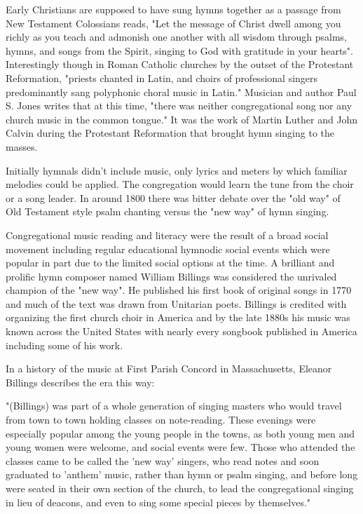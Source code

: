 \documentclass[12pt]{article}
\begin{document}
Early Christians are supposed to have sung hymns together as a passage from New Testament Colossians reads, "Let the message of Christ dwell among you richly as you teach and admonish one another with all wisdom through psalms, hymns, and songs from the Spirit, singing to God with gratitude in your hearts". Interestingly though in Roman Catholic churches by the outset of the Protestant Reformation, "priests chanted in Latin, and choirs of professional singers predominantly sang polyphonic choral music in Latin." Musician and author Paul S. Jones writes that at this time, "there was neither congregational song nor any church music in the common tongue." It was the work of Martin Luther and John Calvin during the Protestant Reformation that brought hymn singing to the masses.

Initially hymnals didn't include music, only lyrics and meters by which familiar melodies could be applied. The congregation would learn the tune from the choir or a song leader. In around 1800 there was bitter debate over the "old way" of Old Testament style psalm chanting versus the "new way" of hymn singing.

Congregational music reading and literacy were the result of a broad social movement including regular educational hymnodic social events which were popular in part due to the limited social options at the time. A brilliant and prolific hymn composer named William Billings was considered the unrivaled champion of the "new way". He published his first book of original songs in 1770 and much of the text was drawn from Unitarian poets. Billings is credited with organizing the first church choir in America and by the late 1880s his music was known across the United States with nearly every songbook published in America including some of his work.

In a history of the music at First Parish Concord in Massachusetts, Eleanor Billings describes the era this way:

"(Billings) was part of a whole generation of singing masters who would travel from town to town holding classes on note-reading. These evenings were especially popular among the young people in the towns, as both young men and young women were welcome, and social events were few. Those who attended the classes came to be called the 'new way' singers, who read notes and soon graduated to 'anthem' music, rather than hymn or psalm singing, and before long were seated in their own section of the church, to lead the congregational singing in lieu of deacons, and even to sing some special pieces by themselves."
\end{document}

